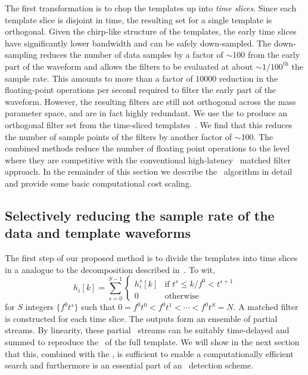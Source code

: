 The first transformation is to chop the \TD{} templates up into \emph{time
slices}.  Since each template slice is disjoint in time, the resulting set for
a single template is orthogonal.  Given the chirp-like structure of the
templates, the early time slices have significantly lower bandwidth and can be
safely down-sampled.  The down-sampling reduces the number of data samples by a
factor of $\sim$100 from the early part of the waveform and allows the filters
to be evaluated at about $\sim$$1/100^\mathrm{th}$ the sample rate. This
amounts to more than a factor of 10000
reduction in the floating-point operations per second required to filter the
early part of the waveform.  However, the resulting filters are still not
orthogonal across the mass parameter space, and are in fact highly redundant.
We use the \SVD{} to produce an orthogonal filter set
from the time-sliced templates~\citep{Cannon:2010p10398}.  We find that this
reduces the number of sample points of the filters by another factor of
$\sim$100.  The combined methods reduce the number of floating point operations
to the level where they are competitive with the conventional high-latency \FD\
matched filter approach.  In the remainder of this section we describe the
\lloid\ algorithm in detail and provide some basic computational cost scaling.  

\subsection{Selectively reducing the sample rate of the data and template waveforms}

The first step of our proposed method is to divide the templates into time
slices in a \TD{} analogue to the \FD{} decomposition described
in~\citep{Marion2004, Buskulic2010}.  To wit,
%
\begin{equation}
\label{eq:time-slices}
h_{i}[k] = \sum_{s=0}^{S-1}
	\begin{cases}
		h_i^s[k] & \textrm{if } t^s \leqslant k / f^0 < t^{s+1} \\
		0 & \textrm{otherwise}
	\end{cases}
\end{equation}
%
for $S$ integers $\{f^0 t^s\}$ such that $0  = f^0 t^0 < f^0 t^1 < \cdots < f^0
t^S = N$.  A matched filter is constructed for each time slice.  The outputs
form an ensemble of partial \SNR{} streams.  By linearity, these partial \SNR\
streams can be suitably time-delayed and summed to reproduce the \SNR\ of the
full template.  We will show in the next section that this, combined with the
\SVD{}, is sufficient to enable a computationally efficient \TD{} search and
furthermore is an essential part of an \earlywarning\ detection scheme.

